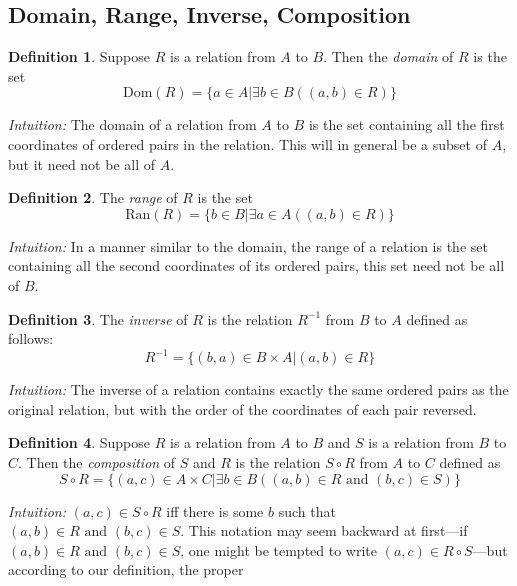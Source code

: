 \documentclass{report}
\theoremstyle{definition}
\newtheorem*{definition}{Definition}
\begin{document}
\subsection{Domain, Range, Inverse, Composition}
\begin{definition}
Suppose $R$ is a relation from $A$ to $B$. Then the \textit{domain} of $R$ is the set
\begin{equation*}
\text{Dom}(R)=\{a\in A|\exists b\in B((a,b)\in R)\}
\end{equation*}
\end{definition}
\noindent\textit{Intuition:} The domain of a relation from $A$ to $B$ is the set containing all the first coordinates of ordered pairs in the relation. This will in general be a subset of $A$, but it need
not be all of $A$.
\begin{definition}
The \textit{range} of $R$ is the set
\begin{equation*}
\text{Ran}(R)=\{b\in B|\exists a\in A((a,b)\in R)\}
\end{equation*}
\end{definition}
\noindent\textit{Intuition:} In a manner similar to the domain, the range of a relation is the set containing all the second coordinates of its ordered pairs, this set need not be all of $B$.
\begin{definition}
The \textit{inverse} of $R$ is the relation $R^{-1}$ from $B$ to $A$ defined as follows:
\begin{equation*}
R^{-1}=\{(b,a)\in B\times A|(a,b)\in R\}
\end{equation*}
\end{definition}
\noindent\textit{Intuition:} The inverse of a relation contains exactly the same ordered pairs as the original relation, but with the order of the coordinates of each pair reversed.
\begin{definition}
Suppose $R$ is a relation from $A$ to $B$ and $S$ is a relation from $B$ to $C$. Then the \textit{composition} of $S$ and $R$ is the relation $S\circ R$ from $A$ to $C$ defined as
\begin{equation*}
S\circ R=\{(a,c)\in A\times C|\exists b\in B((a,b)\in R\text{ and }(b,c)\in S)\}
\end{equation*}
\end{definition}
\noindent\textit{Intuition:} $(a,c)\in S\circ R$ iff there is some $b$ such that $(a,b)\in R\text{ and }(b,c)\in S$. This notation may seem backward at first---if $(a,b)\in R\text{ and }(b,c)\in S$,
one might be tempted to write $(a,c)\in R\circ S$---but according to our definition, the proper
\end{document}
